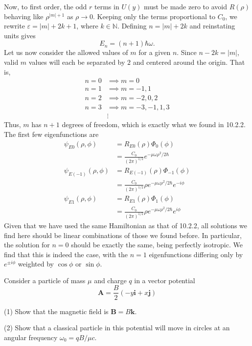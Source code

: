 \documentclass[../principles-of-quantum-mechanics.tex]{subfiles}
\begin{document}
\begin{questions}
\begin{solution}
		Now, to first order, the odd $r$ terms in $U(y)$ must be made zero to avoid $R(\rho)$ behaving like $\rho^{|m|+1}$ as $\rho \to 0$. Keeping only the terms proportional to $C_0$, we rewrite $\varepsilon = |m| + 2k + 1$, where $k\in\mathbb{N}$. Defining $n = |m| + 2k$ and reinstating units gives
		$$E_n = (n + 1)\hbar\omega.$$
		Let us now consider the allowed values of $m$ for a given $n$. Since $n - 2k = |m|$, valid $m$ values will each be separated by $2$ and centered around the origin. That is,
		\begin{align*}
			n = 0 &\implies m = 0 \\
			n = 1 &\implies m = {-1}, 1 \\
			n = 2 &\implies m = {-2}, 0, 2 \\
			n = 3 &\implies m = {-3}, {-1}, {1}, {3} \\
			&\vdots
		\end{align*}
		Thus, $m$ has $n + 1$ degrees of freedom, which is exactly what we found in 10.2.2. The first few eigenfunctions are
		\begin{align*}
			\psi_{E0}(\rho, \phi) &= R_{E0}(\rho)\Phi_0(\phi) \\
			&= \frac{C_0}{(2\pi)^{1/2}}e^{-\mu\omega\rho^2/2\hbar} \\
			\psi_{E(-1)}(\rho, \phi) &= R_{E(-1)}(\rho)\Phi_{-1}(\phi) \\
			&= \frac{C_0}{(2\pi)^{1/2}}\rho e^{-\mu\omega\rho^2/2\hbar}e^{-i\phi} \\
			\psi_{E1}(\rho, \phi) &= R_{E1}(\rho)\Phi_{1}(\phi) \\
			&= \frac{C_0}{(2\pi)^{1/2}}\rho e^{-\mu\omega\rho^2/2\hbar}e^{i\phi}
		\end{align*}
		Given that we have used the same Hamiltonian as that of 10.2.2, all solutions we find here should be linear combinations of those we found before. In particular, the solution for $n = 0$ should be exactly the same, being perfectly isotropic. We find that this is indeed the case, with the $n = 1$ eigenfunctions differing only by $e^{\pm i \phi}$ weighted by $\cos\phi$ or $\sin\phi$.
	\end{solution}
	
	\question Consider a particle of mass $\mu$ and charge $q$ in a vector potential
	$$\mathbf{A} = \frac{B}{2}(-y\mathbf{i} + x\mathbf{j})$$
	
	(1) Show that the magnetic field is $\mathbf{B} = B\mathbf{k}$.
	
	(2) Show that a classical particle in this potential will move in circles at an angular frequency $\omega_0 = qB/\mu c$.
	

\end{questions}
\end{document}
